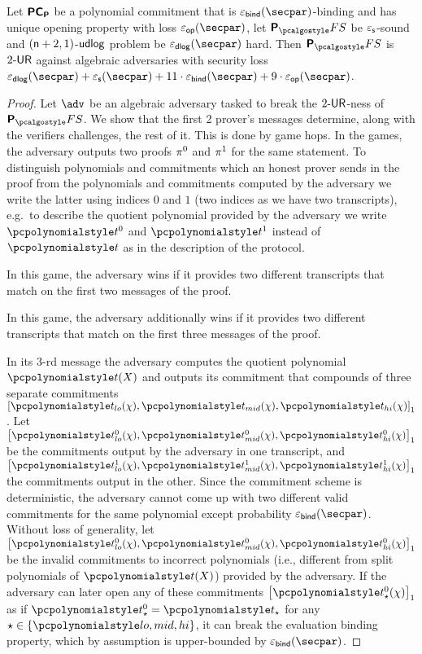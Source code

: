 
\begin{lemma}
	\label{lem:plonkprot_ur_old}
	Let $\bm{\mathsf{PC}}_{\bm{\mathsf{P}}}$ be a polynomial commitment that is $\epsbind(\secpar)$-binding and has unique opening
	property with loss $\epsop(\secpar)$, let $\plonkprotfs$ be $\varepsilon_{\mathsf{s}}$-sound and
		$(\mathsf{n} + 2, 1)$-$\mathsf{udlog}$ problem be $\epsdlog (\secpar)$ hard. Then $\plonkprotfs$ is ${2\text{-}\mathsf{UR}}$ against algebraic adversaries with security loss $\epsdlog(\secpar) + \epss (\secpar) + 11 \cdot \epsbind (\secpar) + 9 \cdot \epsop(\secpar)$.
\end{lemma}

\begin{proof}
	Let $\adv$ be an algebraic adversary tasked to break the ${2\text{-}\mathsf{UR}}$-ness of
	$\plonkprotfs$. We show that the first 2 prover's messages determine, along with
	the verifiers challenges, the rest of it.  This is done by game hops. In the games,
	the adversary outputs two proofs $\pi^0$ and $\pi^1$ for the same statement.
	To distinguish polynomials and commitments which an honest prover sends in the
	proof from the polynomials and commitments computed by the adversary we write the
	latter using indices $0$ and $1$ (two indices as we have two transcripts), e.g.~to
	describe the quotient polynomial provided by the adversary we write $\p{t}^0$ and
	$\p{t}^1$ instead of $\p{t}$ as in the description of the protocol.

 In this game, the adversary wins if it provides two different transcripts that match on the first two messages of the proof.

 In this game, the adversary additionally wins if it provides two different transcripts that match on the first three messages of the proof.

 In its $3$-rd message the adversary computes the
quotient polynomial $\pt(X)$ and outputs its commitment that compounds of three separate commitments $\gone{\p{t_{lo}}(\chi), \p{t_{mid}}(\chi), \p{t_{hi}}(\chi)}$. Let $\gone{\p{t^0_{lo}}(\chi), \p{t^0_{mid}}(\chi), \p{t^0_{hi}}(\chi)}$ be the commitments output by the adversary in one transcript, and $\gone{\p{t^1_{lo}}(\chi), \p{t^1_{mid}}(\chi), \p{t^1_{hi}}(\chi)}$ the commitments output in the other.
%
Since the commitment scheme is deterministic, the adversary cannot come up with two different valid commitments for the same polynomial except probability $\epsbind (\secpar)$. Without loss of generality, let $\gone{\p{t^0_{lo}}(\chi), \p{t^0_{mid}}(\chi), \p{t^0_{hi}}(\chi)}$ be the invalid commitments to incorrect polynomials (i.e., different from split polynomials of $\pt(X)$) provided by the adversary.  If the adversary can later open any of these commitments $\gone{\p{t^0_{\star}}(\chi)}$ as if $\p{t^0_{\star}} = \p{t_{\star}}$ for any $\star \in \{\p{lo, mid, hi}\}$, it can break the evaluation binding property, which by assumption is upper-bounded by $\epsbind(\secpar)$.


\end{proof}

